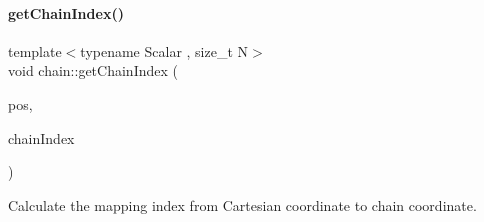 \paragraph{\texorpdfstring{get\+Chain\+Index()}{getChainIndex()}}
{\footnotesize\ttfamily template$<$typename Scalar , size\+\_\+t N$>$ \\
void chain\+::get\+Chain\+Index (\begin{DoxyParamCaption}\item[{const \mbox{\hyperlink{namespacechain_aa715d2f046187ea9f0c3ea55605d6214}{Vector\+Array}}$<$ Scalar, N $>$ \&}]{pos,  }\item[{\mbox{\hyperlink{namespacechain_aa40d2da395c0ac2bc5f37832442ac403}{Index\+Array}}$<$ N $>$ \&}]{chain\+Index }\end{DoxyParamCaption})}



Calculate the mapping index from Cartesian coordinate to chain coordinate. 

